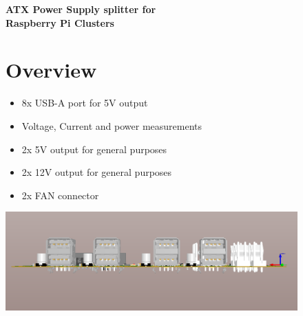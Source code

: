 \documentclass[a4paper,11pt,oneside,pdflatex,english,final,twocolumn]{article}
\author{semaf}
\date{August 2020}
\begin{document}
\pagestyle{fancy}

\chead {\today}

\onecolumn

\begin{figure}[ht]
	\begin{minipage}{1.0\textwidth}
		\raggedleft
		\Huge \textbf{ATX Power Supply splitter for} \\
		\Huge \textbf{Raspberry Pi Clusters}
	\end{minipage}

	\vspace{0.5cm}
	\begin{minipage}{0.47\textwidth}

		\section{Overview}
		\begin{itemize}
			\item 8x USB-A port for 5V output
			\item Voltage, Current and power measurements
			\item 2x 5V output for general purposes
			\item 2x 12V output for general purposes
			\item 2x FAN connector
		\end{itemize}


	\end{minipage}
	\hfill
	\begin{minipage}{0.47\textwidth}
		\centering
		\includegraphics[width=1.0\textwidth,right]{img/Alt_USB.png}

	\end{minipage} \\
	\vspace{0.5cm}


\end{figure}
\end{document}
